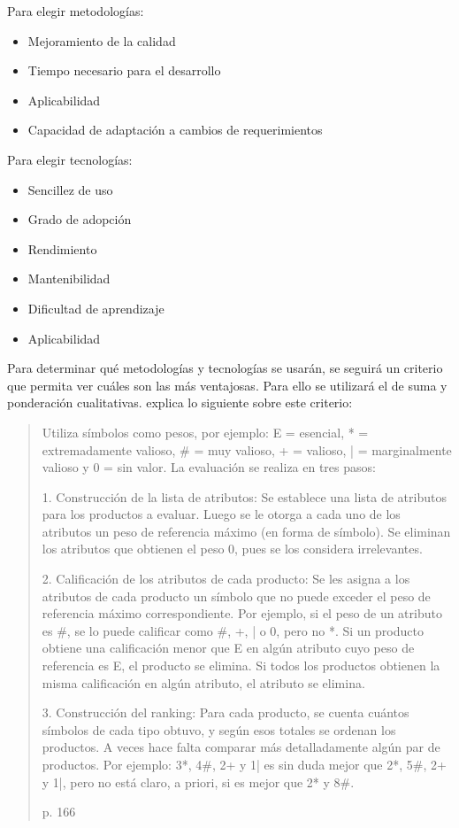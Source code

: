 \documentclass{article}
\begin{document}
Para elegir metodologías:
\begin{itemize}
    \item Mejoramiento de la calidad
    \item Tiempo necesario para el desarrollo
    \item Aplicabilidad
    \item Capacidad de adaptación a cambios de requerimientos
\end{itemize}
Para elegir tecnologías:
\begin{itemize}
    \item Sencillez de uso
    \item Grado de adopción
    \item Rendimiento
    \item Mantenibilidad
    \item Dificultad de aprendizaje
    \item Aplicabilidad
\end{itemize}
Para determinar qué metodologías y tecnologías se usarán, se seguirá un criterio que permita ver cuáles son las más ventajosas. Para ello se utilizará el de suma y ponderación cualitativas. \textcite{scriven} explica lo siguiente sobre este criterio: 
\blockquote[p. 166]{Utiliza símbolos como pesos, por ejemplo: E = esencial, * = extremadamente valioso, \# = muy valioso, + = valioso, | = marginalmente valioso y 
0 = sin valor. La evaluación se realiza en tres pasos: 

1. Construcción de la lista de atributos: Se establece una lista de atributos para los 
productos a evaluar. Luego se le otorga a cada uno de los atributos un peso de 
referencia máximo (en forma de símbolo). Se eliminan los atributos que obtienen el 
peso 0, pues se los considera irrelevantes. 

2. Calificación de los atributos de cada producto: Se les asigna a los atributos de cada 
producto un símbolo que no puede exceder el peso de referencia máximo 
 correspondiente. Por ejemplo, si el peso de un atributo es \#, se lo puede calificar como 
\#, +, | o 0, pero no *. Si un producto obtiene una calificación menor que E en algún 
atributo cuyo peso de referencia es E, el producto se elimina. Si todos los productos 
obtienen la misma calificación en algún atributo, el atributo se elimina. 

3. Construcción del ranking: Para cada producto, se cuenta cuántos símbolos de cada 
tipo obtuvo, y según esos totales se ordenan los productos. A veces hace falta 
comparar más detalladamente algún par de productos. Por ejemplo: 3*, 4\#, 2+ y 1| es 
sin duda mejor que 2*, 5\#, 2+ y 1|, pero no está claro, a priori, si es mejor que 2* y 8\#. }
\end{document}
